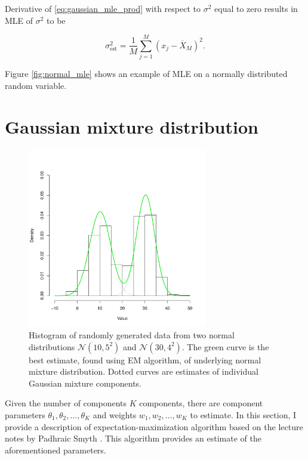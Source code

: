 \documentclass[thesis=B,english]{FITthesis}[2012/06/26]
\begin{document}
\medskip
Derivative of \ref{eq:gaussian_mle_prod} with respect to $\sigma^2$ equal to zero results in MLE of $\sigma^2$ to be

\begin{equation*}
\sigma^2_{\text{est}} = \frac{1}{M} \sum_{j=1}^{M} {(x_j-\overline X_M)^2}.
\end{equation*}

Figure \ref{fig:normal_mle} shows an example of MLE on a normally distributed random variable.

\section{Gaussian mixture distribution}

\begin{figure}
	\centering
 	\includegraphics[width=0.7\textwidth]{gaussian_mixture_estimate}
 	\caption{Histogram of randomly generated data from two normal distributions $\mathcal{N}(10,5^2)$ and $\mathcal{N}(30,4^2)$. The green curve is the best estimate, found using EM algorithm, of underlying normal mixture distribution. Dotted curves are estimates of individual Gaussian mixture components.}
 	\label{fig:gaussian_mixture_est}
\end{figure}

Given the number of components $K$ components, there are component parameters $\theta_1, \theta_2, \dots, \theta_K$ and weights $w_1, w_2, \dots, w_K$ to estimate. In this section, I provide a description of expectation-maximization algorithm based on the lecture notes by Padhraic Smyth \cite{gaussian-mixture-em}. This algorithm provides an estimate of the aforementioned parameters.
\end{document}
